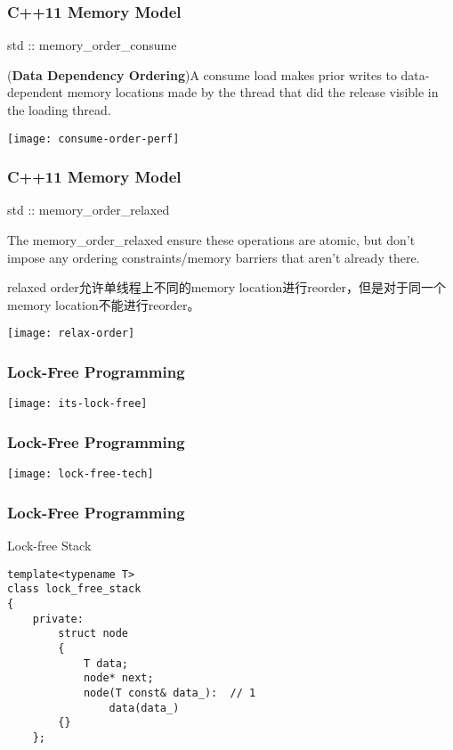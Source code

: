 \begin{frame}
    \frametitle{C++11 Memory Model}
    \LARGE
    std :: memory\_order\_consume
    
    
    \normalsize
    (\textbf{Data Dependency Ordering})A consume load makes prior writes to data-dependent memory
    locations made by the thread that did the release visible in the
    loading thread.
    
    \texttt{[image: consume-order-perf]}
\end{frame}

\begin{frame}
    \frametitle{C++11 Memory Model}
    \LARGE
    std :: memory\_order\_relaxed
    
    
    \normalsize
   The memory\_order\_relaxed ensure these operations are atomic, but don’t impose any ordering constraints/memory barriers that aren’t already there.
   
    relaxed order允许单线程上不同的memory location进行reorder，但是对于同一个memory location不能进行reorder。
    
    \centering
    \texttt{[image: relax-order]}
\end{frame}


\begin{frame}[fragile]
    \frametitle{Lock-Free Programming}
\texttt{[image: its-lock-free]}
    
\end{frame}

\begin{frame}[fragile]
    \frametitle{Lock-Free Programming}
    
   \centering 
   
    \texttt{[image: lock-free-tech]}
\end{frame}

\begin{frame}[fragile]
    \frametitle{Lock-Free Programming}
    \LARGE
    Lock-free Stack
    \normalsize    
    \begin{block}{}
        \begin{verbatim}
template<typename T>
class lock_free_stack
{
    private:
        struct node
        {
            T data;
            node* next;
            node(T const& data_):  // 1
                data(data_)
        {}
    };
\end{verbatim}
    \end{block}
    
\end{frame}


